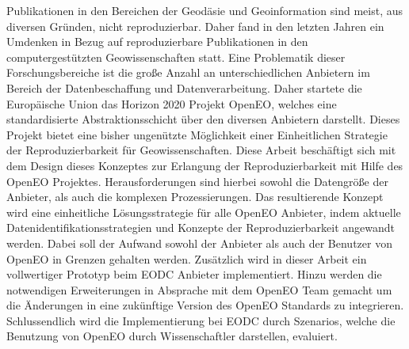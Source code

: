 \documentclass[draft,final]{vutinfth} %
\begin{document}
\begin{kurzfassung}
Publikationen in den Bereichen der Geodäsie und Geoinformation sind meist, aus diversen Gründen, nicht reproduzierbar. Daher fand in den letzten Jahren ein Umdenken in Bezug auf reproduzierbare Publikationen in den computergestützten Geowissenschaften statt. Eine Problematik dieser Forschungsbereiche ist die große Anzahl an unterschiedlichen Anbietern im Bereich der Datenbeschaffung und Datenverarbeitung. Daher startete die Europäische Union das Horizon 2020 Projekt OpenEO, welches eine standardisierte Abstraktionsschicht über den diversen Anbietern darstellt. Dieses Projekt bietet eine bisher ungenützte Möglichkeit einer Einheitlichen Strategie der Reproduzierbarkeit für Geowissenschaften. Diese Arbeit beschäftigt sich mit dem Design dieses Konzeptes zur Erlangung der Reproduzierbarkeit mit Hilfe des OpenEO Projektes. Herausforderungen sind hierbei sowohl die Datengröße der Anbieter, als auch die komplexen Prozessierungen. Das resultierende Konzept wird eine einheitliche Lösungsstrategie für alle OpenEO Anbieter, indem aktuelle Datenidentifikationsstrategien und Konzepte der Reproduzierbarkeit angewandt werden. Dabei soll der Aufwand sowohl der Anbieter als auch der Benutzer von OpenEO in Grenzen gehalten werden. Zusätzlich wird in dieser Arbeit ein vollwertiger Prototyp beim EODC Anbieter implementiert. Hinzu werden die notwendigen Erweiterungen in Absprache mit dem OpenEO Team gemacht um die Änderungen in eine zukünftige Version des OpenEO Standards zu integrieren. Schlussendlich wird die Implementierung bei EODC durch Szenarios, welche die Benutzung von OpenEO durch Wissenschaftler darstellen, evaluiert.        
\end{kurzfassung}
\end{document}
